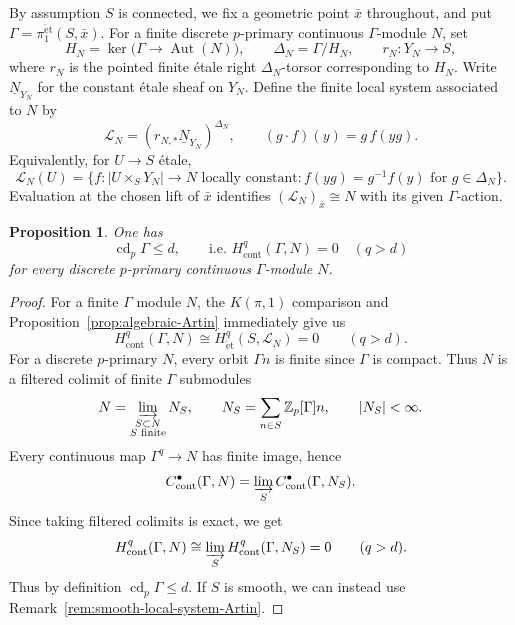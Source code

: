 \documentclass[11pt]{article}
\newtheorem{proposition}[theorem]{Proposition}
\theoremstyle{definition}
\newcommand{\Zp}{\mathbb Z_p}
\newcommand{\et}{\mathrm{\acute et}}
\begin{document}
By assumption \(S\) is connected, we fix a geometric point \(\bar x\) throughout,
and put \(\Gamma=\pi_1^{\et}(S,\bar x)\).  For a finite discrete
\(p\)-primary continuous \(\Gamma\)-module \(N\), set
\[
 H_N=\ker\bigl(\Gamma\longrightarrow\operatorname{Aut}(N)\bigr),
 \qquad \Delta_N=\Gamma/H_N,
 \qquad r_N:Y_N\longrightarrow S,
\]
where \(r_N\) is the pointed finite \'etale right
\(\Delta_N\)-torsor corresponding to \(H_N\).
Write \(\underline N_{Y_N}\) for the constant \'etale sheaf on \(Y_N\).
Define the finite local system associated to \(N\) by
\begin{equation}\label{eq:fundamental-group-local-system}
 \mathcal L_N=(r_{N,*}\underline N_{Y_N})^{\Delta_N},
 \qquad (g\cdot f)(y)=g\,f(yg).
\end{equation}
Equivalently, for \(U\to S\) \'etale,
\[
 \mathcal L_N(U)=
 \bigl\{f:|U\times_SY_N|\longrightarrow N\text{ locally constant}:
          f(yg)=g^{-1}f(y)\text{ for }g\in\Delta_N\bigr\}.
\]
Evaluation at the chosen lift of \(\bar x\) identifies
\((\mathcal L_N)_{\bar x}\cong N\) with its given \(\Gamma\)-action.

\begin{proposition}%
\label{prop:affinoid-fundamental-group-dimension}
One has
\begin{equation}\label{eq:general-affinoid-fundamental-group-dimension}
 \operatorname{cd}_p\Gamma\leq d,
 \qquad\text{i.e. }
 H^q_{\mathrm{cont}}(\Gamma,N)=0
 \quad(q>d)
\end{equation}
for every discrete \(p\)-primary continuous \(\Gamma\)-module \(N\).
\end{proposition}
\begin{proof}
For a finite $\Gamma$ module \(N\), the \(K(\pi,1)\) comparison
\cite[Theorem~4.9]{ScholzeRigid} and
Proposition~\ref{prop:algebraic-Artin} immediately give us
\[
 H^q_{\mathrm{cont}}(\Gamma,N)
 \cong H^q_{\et}(S,\mathcal L_N)=0\qquad(q>d).
\]
For a discrete \(p\)-primary \(N\), every orbit \(\Gamma n\)
is finite since \(\Gamma\) is compact. Thus $N$ is a filtered colimit of finite $\Gamma$ submodules
\[
 N=\varinjlim_{\substack{S\subset N\\S\text{ finite}}}N_S,
 \qquad
 N_S=\sum_{n\in S}\Zp[\Gamma]n,
 \qquad |N_S|<\infty.
\]
Every continuous map \(\Gamma^q\to N\) has finite image, hence
\[
 C^\bullet_{\mathrm{cont}}(\Gamma,N)
 =\varinjlim_S C^\bullet_{\mathrm{cont}}(\Gamma,N_S).
\]
Since taking filtered colimits is exact, we get
\[
 H^q_{\mathrm{cont}}(\Gamma,N)
 \cong\varinjlim_S H^q_{\mathrm{cont}}(\Gamma,N_S)=0
 \qquad(q>d).
\]
Thus by definition \(\operatorname{cd}_p\Gamma\leq d\).
If \(S\) is smooth, we can instead use Remark~\ref{rem:smooth-local-system-Artin}.\end{proof}
\end{document}
